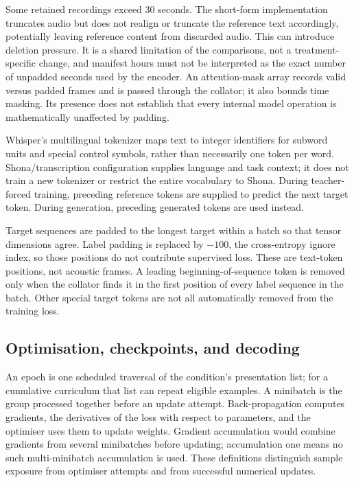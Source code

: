 \documentclass[12pt,a4paper]{report}
\begin{document}
Some retained recordings exceed 30 seconds. The short-form implementation truncates audio but does not realign or truncate the reference text accordingly, potentially leaving reference content from discarded audio. This can introduce deletion pressure. It is a shared limitation of the comparisons, not a treatment-specific change, and manifest hours must not be interpreted as the exact number of unpadded seconds used by the encoder. An attention-mask array records valid versus padded frames and is passed through the collator; it also bounds time masking. Its presence does not establish that every internal model operation is mathematically unaffected by padding.

Whisper's multilingual tokenizer maps text to integer identifiers for subword units and special control symbols, rather than necessarily one token per word. Shona/transcription configuration supplies language and task context; it does not train a new tokenizer or restrict the entire vocabulary to Shona. During teacher-forced training, preceding reference tokens are supplied to predict the next target token. During generation, preceding generated tokens are used instead.

Target sequences are padded to the longest target within a batch so that tensor dimensions agree. Label padding is replaced by $-100$, the cross-entropy ignore index, so those positions do not contribute supervised loss. These are text-token positions, not acoustic frames. A leading beginning-of-sequence token is removed only when the collator finds it in the first position of every label sequence in the batch. Other special target tokens are not all automatically removed from the training loss.

\subsection{Optimisation, checkpoints, and decoding}

An epoch is one scheduled traversal of the condition's presentation list; for a cumulative curriculum that list can repeat eligible examples. A minibatch is the group processed together before an update attempt. Back-propagation computes gradients, the derivatives of the loss with respect to parameters, and the optimiser uses them to update weights. Gradient accumulation would combine gradients from several minibatches before updating; accumulation one means no such multi-minibatch accumulation is used. These definitions distinguish sample exposure from optimiser attempts and from successful numerical updates.
\end{document}
